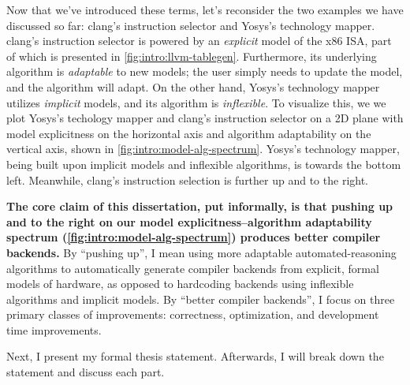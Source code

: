   



Now that we've introduced these terms,
  let's 
  reconsider the two examples we have discussed so far:
  clang's instruction selector
  and Yosys's technology mapper.
clang's instruction selector is powered by
  an \textit{explicit} model of the x86 ISA,
  part of which is presented in
  \cref{fig:intro:llvm-tablegen}.
Furthermore, its underlying algorithm
  is \textit{adaptable} to new models;
  the user simply needs to update
  the model, and the algorithm will adapt.
On the other hand,
  Yosys's technology mapper utilizes
  \textit{implicit} models,
  and its algorithm is \textit{inflexible}.
To visualize this, we
  we plot Yosys's techology mapper
  and clang's instruction selector
  on a 2D plane
  with model explicitness on the horizontal axis
  and algorithm adaptability on the vertical axis,
  shown in \cref{fig:intro:model-alg-spectrum}.
Yosys's technology mapper,
  being built upon implicit models
  and inflexible algorithms,
  is towards the bottom left.
Meanwhile, clang's instruction selection
  is further up and to the right.


\textbf{The core claim of this dissertation,
  put informally,
  is that pushing up
  and to the right
  on our model explicitness--algorithm adaptability
  spectrum (\cref{fig:intro:model-alg-spectrum})
  produces better compiler backends.}
By ``pushing up'',
  I mean
  using
  more adaptable
  \gls{automated-reasoning} algorithms
  to automatically generate
  compiler backends
  from explicit, formal models of hardware,
  as opposed to 
  hardcoding backends
  using inflexible algorithms
  and implicit models.
By ``better compiler backends'',
  I focus on three primary classes
  of improvements:
  correctness,
  optimization,
  and development time improvements.
  
Next, I present my formal
  thesis statement.
Afterwards, I will break down the statement
  and discuss each part.

\begin{mdframed}
\mythesis
\end{mdframed}

